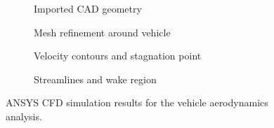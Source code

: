 \documentclass[12pt, a4paper]{article}
\begin{document}
		\begin{figure}[htbp]
			\centering
			\begin{subfigure}[b]{0.48\textwidth}
				\centering
				\caption{Imported CAD geometry}
				\label{fig:cad_geom}
			\end{subfigure}
			\hfill %
			\begin{subfigure}[b]{0.48\textwidth}
				\centering
				\caption{Mesh refinement around vehicle}
				\label{fig:mesh}
			\end{subfigure}
			
			\vspace{0.5cm} %
			
			\begin{subfigure}[b]{0.48\textwidth}
				\centering
				\caption{Velocity contours and stagnation point}
				\label{fig:contour}
			\end{subfigure}
			\hfill
			\begin{subfigure}[b]{0.48\textwidth}
				\centering
				\caption{Streamlines and wake region}
				\label{fig:wake}
			\end{subfigure}
			
			\caption{ANSYS CFD simulation results for the vehicle aerodynamics analysis.}
			\label{fig:all_results}
		\end{figure}
				

	
	
	
\end{document}
